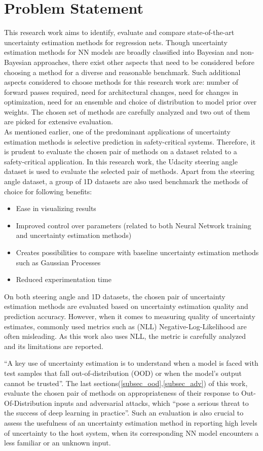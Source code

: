     \section{Problem Statement}
    This research work aims to identify, evaluate and compare state-of-the-art uncertainty estimation methods for regression nets. Though uncertainty estimation methods for NN models are broadly classified into Bayesian and non-Bayesian approaches, there exist other aspects that need to be considered before choosing a method for a diverse and reasonable benchmark. Such additional aspects considered to choose methods for this research work are: number of forward passes required, need for architectural changes, need for changes in optimization, need for an ensemble and choice of distribution to model prior over weights. The chosen set of methods are carefully analyzed and two out of them are picked for extensive evaluation.\\
    As mentioned earlier, one of the predominant applications of uncertainty estimation methods is selective prediction in safety-critical systems. Therefore, it is prudent to evaluate the chosen pair of methods on a dataset related to a safety-critical application. In this research work, the Udacity steering angle dataset is used to evaluate the selected pair of methods. Apart from the steering angle dataset, a group of 1D datasets are also used benchmark the methods of choice for following benefits:
    \begin{itemize}
    	
    	\item Ease in visualizing results
    	\item Improved control over parameters (related to both Neural Network training and uncertainty estimation methods)
    	\item Creates possibilities to compare with baseline uncertainty estimation methods such as Gaussian Processes
    	\item Reduced experimentation time
    \end{itemize}
	On both steering angle and 1D datasets, the chosen pair of uncertainty estimation methods are evaluated based on uncertainty estimation quality and prediction accuracy. However, when it comes to measuring quality of uncertainty estimates, commonly used metrics such as (NLL) Negative-Log-Likelihood are often misleading\cite{yao2019quality}. As this work also uses NLL, the metric is carefully analyzed and its limitations are reported.
	
	\enquote{A key use of uncertainty estimation is to understand when a model is faced with test samples that fall out-of-distribution (OOD) or when the model's output cannot be trusted}\cite{amini2020deep}.
	The last sections(\ref{subsec_ood},\ref{subsec_adv}) of this work, evaluate the chosen pair of methods on appropriateness of their response to Out-Of-Distribution inputs and adversarial attacks, which \enquote{pose a serious threat to the success of deep learning in practice}\cite{akhtar2018threat}. Such an evaluation is also crucial to assess the usefulness of an uncertainty estimation method in reporting high levels of uncertainty to the host system, when its corresponding NN model encounters a less familiar or an unknown input.

